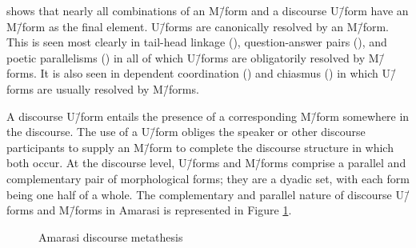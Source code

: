  shows that nearly
all combinations of an M\=/form and a discourse U\=/form
have an M\=/form as the final element.
U\=/forms are canonically resolved by an M\=/form.
This is seen most clearly in tail-head linkage (),
question-answer pairs (), and poetic parallelisms () 
in all of which U\=/forms are obligatorily resolved by M\=/forms.
It is also seen in dependent coordination () and chiasmus ()
in which U\=/forms are usually resolved by M\=/forms.

A discourse U\=/form entails the presence of a
corresponding M\=/form somewhere in the discourse.
The use of a U\=/form obliges the speaker
or other discourse participants to supply an M\=/form
to complete the discourse structure in which both occur.
At the discourse level, U\=/forms and M\=/forms
comprise a parallel and complementary pair of morphological forms;
they are a dyadic set, with each form being one half of a whole.
The complementary and parallel nature of discourse U\=/forms and M\=/forms
in Amarasi is represented in Figure \ref{fig:AmaDisMet}.

\begin{figure}[h]
	\caption{Amarasi discourse metathesis}\label{fig:AmaDisMet}
\end{figure}
